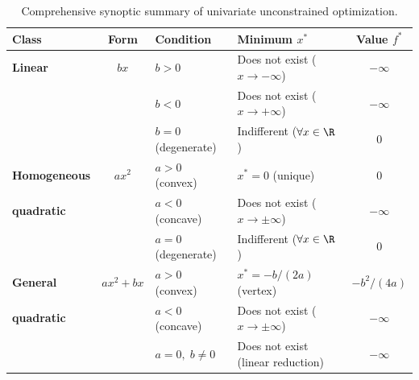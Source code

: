\begin{table}[H]
\centering
\small
\renewcommand{\arraystretch}{1.3}
\begin{tabularx}{\textwidth}{l c l X c}
\toprule
\textbf{Class} & \textbf{Form} & \textbf{Condition} & \textbf{Minimum $x^*$} & \textbf{Value $f^*$} \\
\midrule
\textbf{Linear} & $bx$ & $b > 0$ & Does not exist ($x \to -\infty$) & $-\infty$ \\
                &      & $b < 0$ & Does not exist ($x \to +\infty$) & $-\infty$ \\
                &      & $b = 0$ (degenerate) & Indifferent ($\forall x \in \R$) & $0$ \\
\midrule
\textbf{Homogeneous} & $ax^2$ & $a > 0$ (convex) & $x^* = 0$ (unique) & $0$ \\
\textbf{quadratic}   &        & $a < 0$ (concave) & Does not exist ($x \to \pm\infty$) & $-\infty$ \\
                     &        & $a = 0$ (degenerate) & Indifferent ($\forall x \in \R$) & $0$ \\
\midrule
\textbf{General}   & $ax^2 + bx$ & $a > 0$ (convex) & $x^* = -b/(2a)$ (vertex) & $-b^2/(4a)$ \\
\textbf{quadratic} &             & $a < 0$ (concave) & Does not exist ($x \to \pm\infty$) & $-\infty$ \\
                   &             & $a = 0, \; b \neq 0$ & Does not exist (linear reduction) & $-\infty$ \\
\bottomrule
\end{tabularx}
\caption{Comprehensive synoptic summary of univariate unconstrained optimization.}
\label{tab:synoptic-univariate-en}
\end{table}
